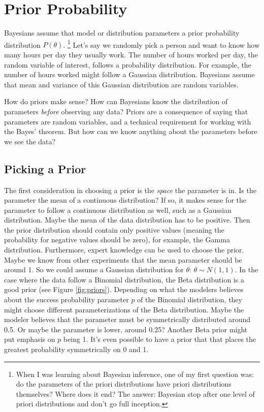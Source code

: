 \documentclass[
  10pt,
]{scrbook}
\begin{document}
\hypertarget{prior-probability}{%
\section{Prior Probability}\label{prior-probability}}

Bayesians assume that model or distribution parameters a prior probability distribution \(P(\theta)\). \footnote{When I was learning about Bayesian inference, one of my first question was: do the parameters of the priori distributions have priori distributions themselves? Where does it end? The answer: Bayesian stop after one level of priori distributions and don't go full inception.}
Let's say we randomly pick a person and want to know how many hours per day they usually work.
The number of hours worked per day, the random variable of interest, follows a probability distribution.
For example, the number of hours worked might follow a Gaussian distribution.
Bayesians assume that mean and variance of this Gaussian distribution are random variables.

How do priors make sense?
How can Bayesians know the distribution of parameters \emph{before} observing any data?
Priors are a consequence of saying that parameters are random variables, and a technical requirement for working with the Bayes' theorem.
But how can we know anything about the parameters before we see the data?

\hypertarget{picking-a-prior}{%
\subsection*{Picking a Prior}\label{picking-a-prior}}


The first consideration in choosing a prior is the \emph{space} the parameter is in.
Is the parameter the mean of a continuous distribution?
If so, it makes sense for the parameter to follow a continuous distribution as well, such as a Gaussian distribution.
Maybe the mean of the data distribution has to be positive.
Then the prior distribution should contain only positive values (meaning the probability for negative values should be zero), for example, the Gamma distribution.
Furthermore, expert knowledge can be used to choose the prior.
Maybe we know from other experiments that the mean parameter should be around 1.
So we could assume a Gaussian distribution for \(\theta\): \(\theta \sim N(1, 1)\).
In the case where the data follow a Binomial distribution, the Beta distribution is a good prior (see Figure \ref{fig:priors}).
Depending on what the modelers believes about the success probability parameter \(p\) of the Binomial distribution, they might choose different parameterizations of the Beta distribution.
Maybe the modeler believes that the parameter must be symmetrically distributed around 0.5.
Or maybe the parameter is lower, around 0.25?
Another Beta prior might put emphasis on \(p\) being 1.
It's even possible to have a prior that that places the greatest probability symmetrically on 0 and 1.
\end{document}
